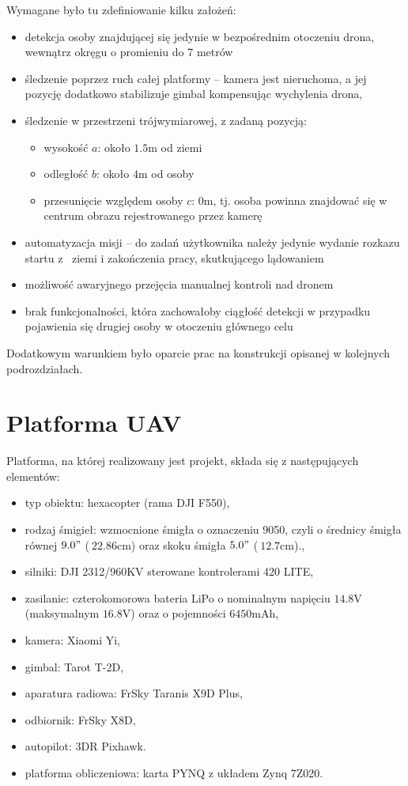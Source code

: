 Wymagane było tu zdefiniowanie kilku założeń:
\begin{itemize}
	\item detekcja osoby znajdującej się jedynie w bezpośrednim otoczeniu drona, wewnątrz okręgu o promieniu do 7 metrów
	\item śledzenie poprzez ruch całej platformy -- kamera jest nieruchoma, a jej pozycję dodatkowo stabilizuje gimbal kompensując wychylenia drona,
	\item śledzenie w przestrzeni trójwymiarowej, z zadaną pozycją:
	\begin{itemize}
		\item wysokość $a$: około $1.5$m od ziemi
		\item odległość $b$: około $4$m od osoby
		\item przesunięcie względem osoby $c$: $0$m, tj. osoba powinna znajdować się w centrum obrazu rejestrowanego przez kamerę		
	\end{itemize} 
	\item automatyzacja misji -- do zadań użytkownika należy jedynie wydanie rozkazu startu z~ ziemi i zakończenia pracy, skutkującego lądowaniem
	\item możliwość awaryjnego przejęcia manualnej kontroli nad dronem
	\item brak funkcjonalności, która zachowałoby ciągłość detekcji w przypadku pojawienia się drugiej osoby w otoczeniu głównego celu
\end{itemize}


Dodatkowym warunkiem było oparcie prac na konstrukcji opisanej w kolejnych podrozdziałach.

\section{Platforma UAV}
Platforma, na której realizowany jest projekt, składa się z następujących elementów:
\begin{itemize}
	\item typ obiektu: hexacopter (rama DJI F550),
	\item rodzaj śmigieł: wzmocnione śmigła o oznaczeniu 9050, czyli o średnicy śmigła równej $9.0"$ ($~22.86$cm) oraz skoku śmigła $5.0"$ ($~12.7$cm).,
	\item silniki: DJI 2312/960KV sterowane kontrolerami 420 LITE,
	\item zasilanie: czterokomorowa bateria LiPo o nominalnym napięciu $14.8$V (maksymalnym $16.8$V) oraz o pojemności $6450$mAh,
	\item kamera: Xiaomi Yi,
	\item gimbal: Tarot T-2D,
	\item aparatura radiowa: FrSky Taranis X9D Plus,
	\item odbiornik: FrSky X8D,
	\item autopilot: 3DR Pixhawk.
    \item platforma obliczeniowa: karta PYNQ z układem Zynq 7Z020.
\end{itemize}

